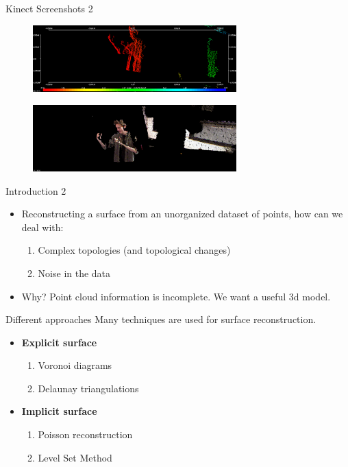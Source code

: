 \documentclass{beamer}
\begin{document}
\begin{frame}{Kinect Screenshots 2}
  \begin{figure}[H]
  \centering
  \includegraphics[width=0.7\textwidth]{img/pts.png}
  \end{figure}
  \begin{figure}[H]
  \centering
  \includegraphics[width=0.7\textwidth]{img/pcl.png}
  \end{figure}
\end{frame}

\begin{frame}{Introduction 2}
  \begin{itemize}
  \item Reconstructing a surface from an unorganized dataset of points, how can we deal with:
  \begin{enumerate}
    \item Complex topologies (and topological changes)
    \item Noise in the data
  \end{enumerate}
  \item Why? Point cloud information is incomplete. We want a useful 3d model.
  \end{itemize}
\end{frame}

\begin{frame}{Different approaches}
  Many techniques are used for surface reconstruction.
  \begin{itemize} %
  \item \textbf{Explicit surface} %
  \begin{enumerate}
    \item Voronoi diagrams
    \item Delaunay triangulations
  \end{enumerate}
  \item \textbf{Implicit surface} %
  \begin{enumerate}
    \item Poisson reconstruction
    \item Level Set Method
  \end{enumerate}
  \end{itemize}
\end{frame}
\end{document}

